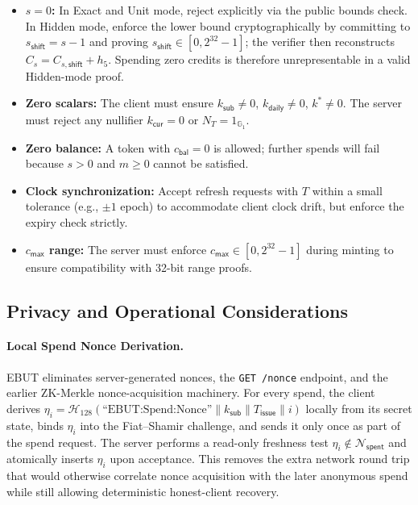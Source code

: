 \documentclass[11pt]{article}
\theoremstyle{definitionstyle}
\theoremstyle{plain}
\begin{document}
\begin{itemize}[leftmargin=*]
\item \textbf{$s = 0$:} In Exact and Unit mode, reject explicitly via the public bounds check. In Hidden mode, enforce the lower bound cryptographically by committing to $s_{\mathsf{shift}} = s-1$ and proving $s_{\mathsf{shift}} \in [0,2^{32}-1]$; the verifier then reconstructs $C_s = C_{s,\mathsf{shift}} + h_5$. Spending zero credits is therefore unrepresentable in a valid Hidden-mode proof.
\item \textbf{Zero scalars:} The client must ensure $k_{\mathsf{sub}} \neq 0$, $k_{\mathsf{daily}} \neq 0$, $k^* \neq 0$. The server must reject any nullifier $k_{\mathsf{cur}} = 0$ or $N_T = 1_{\mathbb{G}_1}$.
\item \textbf{Zero balance:} A token with $c_{\mathsf{bal}} = 0$ is allowed; further spends will fail because $s > 0$ and $m \ge 0$ cannot be satisfied.
\item \textbf{Clock synchronization:} Accept refresh requests with $T$ within a small tolerance (e.g., $\pm 1$ epoch) to accommodate client clock drift, but enforce the expiry check strictly.
\item \textbf{$c_{\mathsf{max}}$ range:} The server must enforce $c_{\mathsf{max}} \in [0, 2^{32}-1]$ during minting to ensure compatibility with 32-bit range proofs.
\end{itemize}

\subsection{Privacy and Operational Considerations}

\paragraph{Local Spend Nonce Derivation.}
EBUT eliminates server-generated nonces, the \texttt{GET /nonce} endpoint, and the earlier ZK-Merkle nonce-acquisition machinery. For every spend, the client derives $\eta_i = \mathcal{H}_{128}(\text{``EBUT:Spend:Nonce''} \parallel k_{\mathsf{sub}} \parallel T_{\mathsf{issue}} \parallel i)$ locally from its secret state, binds $\eta_i$ into the Fiat--Shamir challenge, and sends it only once as part of the spend request. The server performs a read-only freshness test $\eta_i \notin \mathcal{N}_{\mathsf{spent}}$ and atomically inserts $\eta_i$ upon acceptance. This removes the extra network round trip that would otherwise correlate nonce acquisition with the later anonymous spend while still allowing deterministic honest-client recovery.
\end{document}
